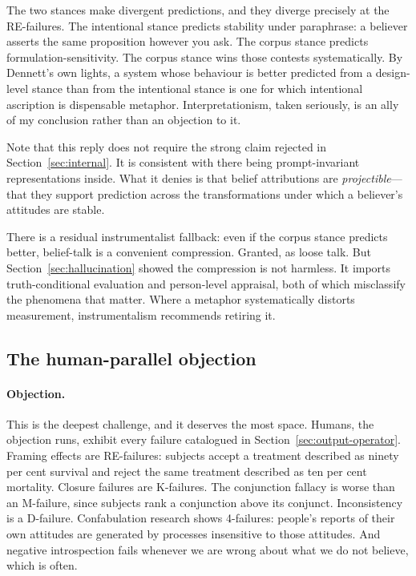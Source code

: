 The two stances make divergent predictions, and they diverge precisely at the
RE-failures. The intentional stance predicts stability under paraphrase: a
believer asserts the same proposition however you ask. The corpus stance predicts
formulation-sensitivity. The corpus stance wins those contests systematically. By
Dennett's own lights, a system whose behaviour is better predicted from a
design-level stance than from the intentional stance is one for which intentional
ascription is dispensable metaphor. Interpretationism, taken seriously, is an ally
of my conclusion rather than an objection to it.

Note that this reply does not require the strong claim rejected in
Section~\ref{sec:internal}. It is consistent with there being
prompt-invariant representations inside. What it denies is that belief
attributions are \emph{projectible}---that they support prediction across the
transformations under which a believer's attitudes are stable.

There is a residual instrumentalist fallback: even if the corpus stance predicts
better, belief-talk is a convenient compression. Granted, as loose talk. But
Section~\ref{sec:hallucination} showed the compression is not harmless. It
imports truth-conditional evaluation and person-level appraisal, both of which
misclassify the phenomena that matter. Where a metaphor systematically distorts
measurement, instrumentalism recommends retiring it.

\subsection{The human-parallel objection}
\label{sec:human-parallel}

\paragraph{Objection.} This is the deepest challenge, and it deserves the most
space. Humans, the objection runs, exhibit every failure catalogued in
Section~\ref{sec:output-operator}. Framing effects
\citep{tversky1981} are RE-failures: subjects accept a treatment described as
ninety per cent survival and reject the same treatment described as ten per cent
mortality. Closure failures are K-failures. The conjunction fallacy is worse than
an M-failure, since subjects rank a conjunction above its conjunct. Inconsistency
is a D-failure. Confabulation research shows 4-failures: people's reports of their
own attitudes are generated by processes insensitive to those attitudes. And
negative introspection fails whenever we are wrong about what we do not believe,
which is often.


